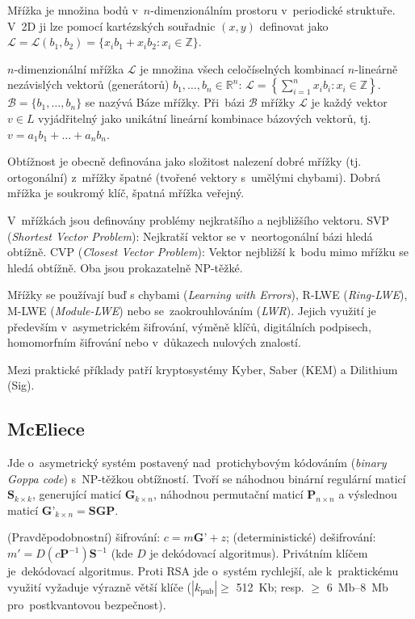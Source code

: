 Mřížka je množina bodů v~$n$-dimenzionálním prostoru v~periodické struktuře.
V~2D ji lze pomocí kartézských souřadnic $(x, y)$ definovat jako
$\mathcal{L} = \mathcal{L}(b_1, b_2) = \{x_i b_1 + x_i b_2 : x_i \in \mathbb{Z}\}$.

$n$-dimenzionální mřížka $\mathcal{L}$ je množina všech celočíselných kombinací $n$-lineárně nezávislých vektorů (generátorů) $b_1, \dots, b_n \in \mathbb{R}^n$:
$\mathcal{L} = \left\{ \sum_{i=1}^n x_i b_i : x_i \in \mathbb{Z} \right\}$.
$\mathcal{B} = \{b_1, \dots, b_n\}$ se nazývá Báze mřížky.
Při~bázi $\mathcal{B}$ mřížky $\mathcal{L}$ je každý vektor $v \in L$ vyjádřitelný jako unikátní lineární kombinace bázových vektorů, tj. $v = a_1 b_1 + \dots + a_n b_n$.

Obtížnost je obecně definována jako složitost nalezení dobré mřížky (tj. ortogonální) z~mřížky špatné (tvořené vektory s~umělými chybami).
Dobrá mřížka je soukromý klíč, špatná mřížka veřejný.

V~mřížkách jsou definovány problémy nejkratšího a nejbližšího vektoru.
SVP (\emph{Shortest Vector Problem}): Nejkratší vektor se v~neortogonální bázi hledá obtížně.
CVP (\emph{Closest Vector Problem}): Vektor nejbližší k~bodu mimo mřížku se hledá obtížně.
Oba jsou prokazatelně NP-těžké.

Mřížky se používají buď s chybami (\emph{Learning with Errors}), R-LWE (\emph{Ring-LWE}), M-LWE (\emph{Module-LWE}) nebo se~zaokrouhlováním (\emph{LWR}).
Jejich využití je především v~asymetrickém šifrování, výměně klíčů, digitálních podpisech, homomorfním šifrování nebo v~důkazech nulových znalostí.

Mezi praktické příklady patří kryptosystémy Kyber, Saber (KEM) a Dilithium (Sig).

\subsection{McEliece}

Jde o~asymetrický systém postavený nad~protichybovým kódováním (\emph{binary Goppa code}) s~NP-těžkou obtížností.
Tvoří se náhodnou binární regulární maticí $\textbf{S}_{k \times k}$, generující maticí $\textbf{G}_{k \times n}$, náhodnou permutační maticí $\textbf{P}_{n \times n}$ a výslednou maticí $\textbf{G'}_{k \times n} = \textbf{SGP}$.

(Pravděpodobnostní) šifrování: $c = m\textbf{G'} + z$; (deterministické) dešifrování: $m' = D(c\textbf{P}^{-1})\textbf{S}^{-1}$ (kde $D$ je dekódovací algoritmus).
Privátním klíčem je~dekódovací algoritmus.
Proti RSA jde o~systém rychlejší, ale k~praktickému využití vyžaduje výrazně větší klíče ($| k_\text{pub} | \geq$ 512~Kb; resp. $\geq$ 6~Mb--8~Mb pro~postkvantovou bezpečnost).

